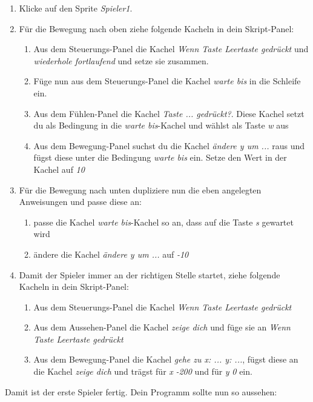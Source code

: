 \begin{enumerate}
\item Klicke auf den Sprite \emph{Spieler1}.
\item Für die Bewegung nach oben ziehe folgende Kacheln in dein Skript-Panel:
  \begin{enumerate}
  \item Aus dem Steuerungs-Panel die Kachel \textit{Wenn Taste Leertaste gedrückt} und \textit{wiederhole fortlaufend} und setze sie zusammen.
  \item Füge nun aus dem Steuerungs-Panel die Kachel \textit{warte bis} in die Schleife ein.
  \item Aus dem Fühlen-Panel die Kachel \textit{Taste ... gedrückt?}. Diese Kachel setzt du als Bedingung in die \textit{warte bis}-Kachel und wählst als Taste \emph{w} aus 
  \item Aus dem Bewegung-Panel suchst du die Kachel \textit{ändere y um ...} raus und fügst diese unter die Bedingung \textit{warte bis} ein. Setze den Wert in der Kachel auf \emph{10}    
  \end{enumerate}
\item Für die Bewegung nach unten dupliziere nun die eben angelegten Anweisungen und passe diese an:
  \begin{enumerate}
  \item passe die Kachel \textit{warte bis}-Kachel so an, dass auf die Taste \emph{s} gewartet wird
  \item ändere die Kachel \textit{ändere y um ...} auf \emph{-10}  
  \end{enumerate}
\item Damit der Spieler immer an der richtigen Stelle startet, ziehe folgende Kacheln in dein Skript-Panel:
  \begin{enumerate}
  \item Aus dem Steuerungs-Panel die Kachel \textit{Wenn Taste Leertaste gedrückt}
  \item Aus dem Aussehen-Panel die Kachel \textit{zeige dich} und füge sie an \textit{Wenn Taste Leertaste gedrückt}
  \item Aus dem Bewegung-Panel die Kachel \textit{gehe zu x: ... y: ...}, fügst diese an die Kachel \textit{zeige dich} und trägst für \emph{x} \emph{-200} und für \emph{y} \emph{0} ein.
  \end{enumerate}
\end{enumerate}

Damit ist der erste Spieler fertig. Dein Programm sollte nun so aussehen:

